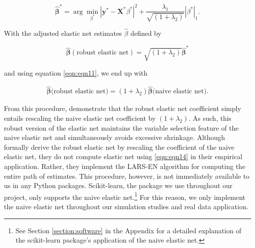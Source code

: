 $$
\hat{\boldsymbol{\beta}}^{*}=\arg \min _{\beta^{*}}\left|\mathbf{y}^{*}-\mathbf{X}^{*} \beta^{*}\right|^{2}+\frac{\lambda_{1}}{\sqrt{(1+\lambda_{2})}}|\beta^{*}|_{1} .
$$

\noindent With the adjusted elastic net estimates $\hat{\beta}$ defined by

$$
\hat{\boldsymbol{\beta}}(\text {robust elastic net})=\sqrt{(1+\lambda_{2})}\hat{\boldsymbol{\beta}}^{*} 
$$

\noindent and using equation \eqref{eqn:eqn11}, we end up with

\begin{align}
\label{eqn:eqn14}
\hat{\boldsymbol{\beta}}\text{(robust elastic net)}=\left(1+\lambda_{2}\right) \hat{\boldsymbol{\beta}}\text{(naive elastic net)}.
\end{align}

\noindent From this procedure, \cite{zou2005regularization} demonstrate that the robust elastic net coefficient simply entails rescaling the naive elastic net coefficient by $(1 + \lambda_{2})$. As such, this robust version of the elastic net maintains the variable selection feature of the naive elastic net and simultaneously avoids excessive shrinkage. Although \cite{zou2005regularization} formally derive the robust elastic net by rescaling the coefficient of the naive elastic net, they do not compute elastic net using \eqref{eqn:eqn14} in their empirical application. Rather, they implement the LARS-EN algorithm for computing the entire path of estimates. This procedure, however, is not immediately available to us in any Python packages. Scikit-learn, the package we use throughout our project, only supports the naive elastic net.\footnote{See Section \ref{section:software} in the Appendix for a detailed explanation of the scikit-learn package's application of the naive elastic net.} For this reason, we only implement the naive elastic net throughout our simulation studies and real data application.  

